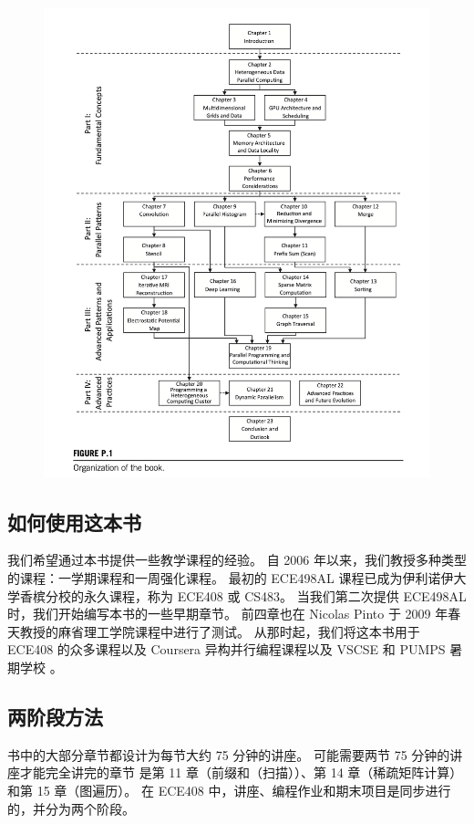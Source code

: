 \begin{figure}[!htbp]
	\includegraphics[width=\textwidth]{figs/P.1.png}
\end{figure}

\subsection{如何使用这本书}
我们希望通过本书提供一些教学课程的经验。 自 2006 年以来，我们教授多种类型的课程：一学期课程和一周强化课程。 
最初的 ECE498AL 课程已成为伊利诺伊大学香槟分校的永久课程，称为 ECE408 或 CS483。 
当我们第二次提供 ECE498AL 时，我们开始编写本书的一些早期章节。 
前四章也在 Nicolas Pinto 于 2009 年春天教授的麻省理工学院课程中进行了测试。
从那时起，我们将这本书用于 ECE408 的众多课程以及 Coursera 异构并行编程课程以及 VSCSE 和 PUMPS 暑期学校 。

\subsection{两阶段方法}
书中的大部分章节都设计为每节大约 75 分钟的讲座。 可能需要两节 75 分钟的讲座才能完全讲完的章节
是第 11 章（前缀和（扫描））、第 14 章（稀疏矩阵计算）和第 15 章（图遍历）。 
在 ECE408 中，讲座、编程作业和期末项目是同步进行的，并分为两个阶段。

